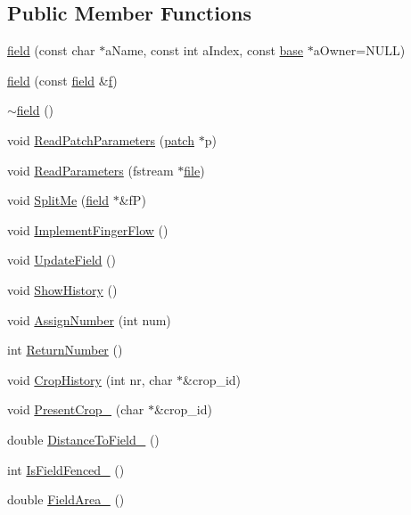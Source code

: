 \subsection*{Public Member Functions}
\begin{DoxyCompactItemize}
\item 
\hyperlink{classfield_aba5192e37ab34e3da4561bd79c23c9ec}{field} (const char $\ast$aName, const int aIndex, const \hyperlink{classbase}{base} $\ast$aOwner=NULL)
\item 
\hyperlink{classfield_aa173f413fc94d3ffc5aeb68d453dc700}{field} (const \hyperlink{classfield}{field} \&\hyperlink{classfield_a2d250d63f6438e6ebdfd1e4c4bf1292e}{f})
\item 
\hyperlink{classfield_a600cf76c8c366764a8e0e6a48e43d0fd}{$\sim$field} ()
\item 
void \hyperlink{classfield_a7eb47d106515b522ec6a8c117ab19db9}{ReadPatchParameters} (\hyperlink{classpatch}{patch} $\ast$p)
\item 
void \hyperlink{classfield_a52be92c175965887ed3f016cb7c683fe}{ReadParameters} (fstream $\ast$\hyperlink{classbase_a3af52ee9891719d09b8b19b42450b6f6}{file})
\item 
void \hyperlink{classfield_ae5c00c9f05eaf3f156bc1e133cff88e9}{SplitMe} (\hyperlink{classfield}{field} $\ast$\&fP)
\item 
void \hyperlink{classfield_a1654a805f18f2b50214dcde5dcac2b92}{ImplementFingerFlow} ()
\item 
void \hyperlink{classfield_a90e670aa48996bbf164c0df85ae5590e}{UpdateField} ()
\item 
void \hyperlink{classfield_aa0a885f9ccaccf1004a295f48a767992}{ShowHistory} ()
\item 
void \hyperlink{classfield_a29216588259cbd4b0c9877ee5de0df0b}{AssignNumber} (int num)
\item 
int \hyperlink{classfield_ae217e8d00b4c340b9aa7ace73f69f1db}{ReturnNumber} ()
\item 
void \hyperlink{classfield_a468fc8855c94286509a39dfcd8130c2b}{CropHistory} (int nr, char $\ast$\&crop\_\-id)
\item 
void \hyperlink{classfield_ac88e569c5e0854563c505665eba50e24}{PresentCrop\_\-} (char $\ast$\&crop\_\-id)
\item 
double \hyperlink{classfield_aab17aa694538578ace4f6fc40cc561fc}{DistanceToField\_\-} ()
\item 
int \hyperlink{classfield_a71f3063168d6fd870a8f46ae64de6e43}{IsFieldFenced\_\-} ()
\item 
double \hyperlink{classfield_a06bf7fac158821737ac02588c50008a2}{FieldArea\_\-} ()

\end{DoxyCompactItemize}
